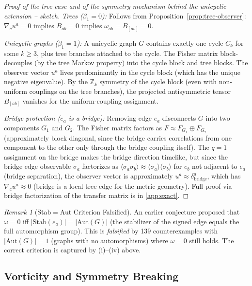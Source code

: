 \documentclass[11pt]{article}
\theoremstyle{definition}
\theoremstyle{remark}
\newtheorem{remark}[theorem]{Remark}
\newcommand{\Fish}{F}
\newcommand{\obs}{u}
\newcommand{\vort}{\omega}
\newcommand{\edgeo}{\sigma}
\newcommand{\betti}{\beta_1}
\begin{document}
\begin{proof}[Proof of the tree case and of the symmetry mechanism behind the unicyclic extension -- sketch]
\textit{Trees ($\betti = 0$):} Follows from
Proposition~\ref{prop:tree-observer}: $\nabla_c \obs^a = 0$ implies
$B_{ab} = 0$ implies $\vort_{ab} = B_{[ab]} = 0$.

\textit{Unicyclic graphs ($\betti = 1$):} A unicyclic graph $G$
contains exactly one cycle $C_k$ for some $k \geq 3$, plus tree
branches attached to the cycle. The Fisher matrix block-decouples
(by the tree Markov property) into the cycle block and tree blocks.
The observer vector $\obs^a$ lives predominantly in the cycle block
(which has the unique negative eigenvalue). By the $\mathbb{Z}_k$
symmetry of the cycle block (even with non-uniform couplings on
the tree branches), the projected antisymmetric tensor $B_{[ab]}$
vanishes for the uniform-coupling assignment.

\textit{Bridge protection ($e_a$ is a bridge):} Removing edge $e_a$
disconnects $G$ into two components $G_1$ and $G_2$. The Fisher matrix
factors as $\Fish \approx \Fish_{G_1} \oplus \Fish_{G_2}$ (approximately
block diagonal, since the bridge carries correlations from one component
to the other only through the bridge coupling itself). The $q = 1$
assignment on the bridge makes the bridge direction timelike, but
since the bridge edge observable $\edgeo_a$ factorizes as
$\langle \edgeo_a \edgeo_b \rangle \approx \langle \edgeo_a \rangle
\langle \edgeo_b \rangle$ for $e_b$ not adjacent to $e_a$
(bridge separation), the observer vector is approximately
$\obs^a \approx \delta^a_{\text{bridge}}$, which has
$\nabla_c \obs^a \approx 0$ (bridge is a local tree edge for the
metric geometry). Full proof via bridge factorization of the
transfer matrix is in \cref{app:exact}.
\end{proof}

\begin{remark}[Stab$=$Aut Criterion Falsified]
An earlier conjecture proposed that $\vort = 0$ iff
$|\mathrm{Stab}(e_a)| = |\mathrm{Aut}(G)|$ (the stabilizer of the
signed edge equals the full automorphism group). This is
\emph{falsified} by 139 counterexamples with $|\mathrm{Aut}(G)| = 1$
(graphs with no automorphisms) where $\vort = 0$ still holds.
The correct criterion is captured by (i)--(iv) above.
\end{remark}

\subsection{Vorticity and Symmetry Breaking}
\label{subsec:vorticity-symmetry}
\end{document}
